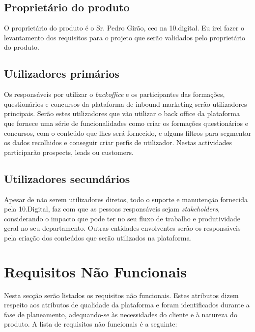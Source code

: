 \subsection{Proprietário do produto}

O proprietário do produto é o Sr. Pedro Girão, \acrshort{ceo} na 10.digital. Eu irei fazer o levantamento dos requisitos para o projeto que serão validados pelo proprietário do produto.

\subsection{Utilizadores primários}

Os responsáveis por utilizar o \textit{backoffice} e os participantes das formações, questionários e concursos da plataforma de inbound marketing serão utilizadores principais. Serão estes utilizadores que vão utilizar o back office da plataforma que fornece uma série de funcionalidades como criar os formações questionários e concursos, com o conteúdo que lhes será fornecido, e alguns filtros para segmentar os dados recolhidos e conseguir criar perfis de utilizador. Nestas actividades participarão prospects, leads ou customers.


\subsection{Utilizadores secundários}

Apesar de não serem utilizadores diretos, todo o suporte e manutenção fornecida pela 10.Digital, faz com que as pessoas responsáveis sejam \textit{stakeholders}, considerando o impacto que pode ter no seu fluxo de trabalho e produtividade geral no seu departamento. 
Outras entidades envolventes serão os responsáveis pela criação dos conteúdos que serão utilizados na plataforma.


\section{Requisitos Não Funcionais}
\label{rnf}

Nesta secção serão listados os requisitos não funcionais. Estes atributos dizem respeito aos atributos de qualidade da plataforma e foram identificados durante a fase de planeamento, adequando-se às necessidades do cliente e à natureza do produto. A lista de requisitos não funcionais é a seguinte:

